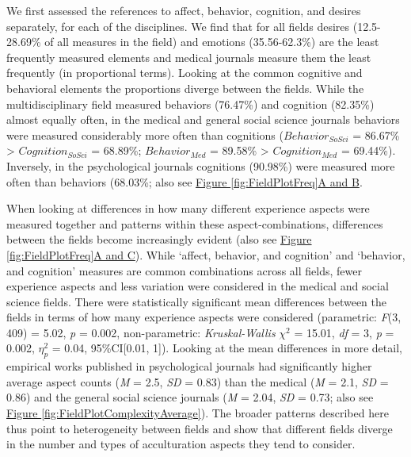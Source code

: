 \documentclass[man, 12pt, a4paper, mask]{apa7}
\newcommand{\fgrref}[2][]{\hyperref[#2]{Figure \ref*{#2}#1}}
\begin{document}
We first assessed the references to affect, behavior, cognition, and
desires separately, for each of the disciplines. We find that for all
fields desires (12.5-28.69\% of all measures in the field) and emotions
(35.56-62.3\%) are the least frequently measured elements and medical
journals measure them the least frequently (in proportional terms).
Looking at the common cognitive and behavioral elements the proportions
diverge between the fields. While the multidisciplinary field measured
behaviors (76.47\%) and cognition (82.35\%) almost equally often, in the
medical and general social science journals behaviors were measured
considerably more often than cognitions (\(Behavior_{SoSci}\) = 86.67\%
\textgreater{} \(Cognition_{SoSci}\) = 68.89\%; \(Behavior_{Med}\) =
89.58\% \textgreater{} \(Cognition_{Med}\) = 69.44\%). Inversely, in the
psychological journals cognitions (90.98\%) were measured more often
than behaviors (68.03\%; also see \fgrref[A and B]{fig:FieldPlotFreq}.

When looking at differences in how many different experience aspects
were measured together and patterns within these aspect-combinations,
differences between the fields become increasingly evident (also see
\fgrref[A and C]{fig:FieldPlotFreq}). While `affect, behavior, and
cognition' and `behavior, and cognition' measures are common
combinations across all fields, fewer experience aspects and less
variation were considered in the medical and social science fields.
There were statistically significant mean differences between the fields
in terms of how many experience aspects were considered (parametric:
\textit{F}(3, 409) = 5.02, \textit{p} = 0.002, non-parametric:
\textit{Kruskal-Wallis} \(\chi^{2}\) = 15.01, \textit{df} = 3,
\textit{p} = 0.002, \(\eta_{p}^{2}\) = 0.04, 95\%CI{[}0.01, 1{]}).
Looking at the mean differences in more detail, empirical works
published in psychological journals had significantly higher average
aspect counts (\textit{M} = 2.5, \textit{SD} = 0.83) than the medical
(\textit{M} = 2.1, \textit{SD} = 0.86) and the general social science
journals (\textit{M} = 2.04, \textit{SD} = 0.73; also see
\fgrref{fig:FieldPlotComplexityAverage}). The broader patterns described
here thus point to heterogeneity between fields and show that different
fields diverge in the number and types of acculturation aspects they
tend to consider.
\end{document}
